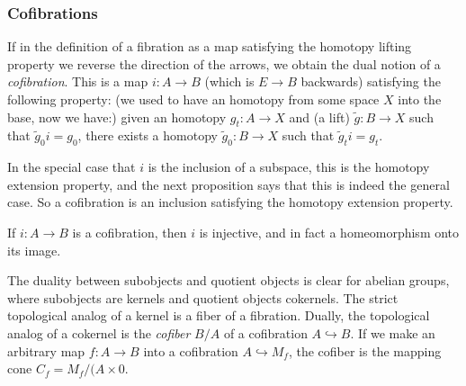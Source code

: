 \subsubsection{Cofibrations}

\begin{definition}[Hatcher]
	If in the definition of a fibration as a map satisfying the homotopy lifting property we reverse the direction of the arrows, we obtain the dual notion of a {\it cofibration}. This is a map $i:A\to B$ {\color{persimmon}(which is $E\to B$ backwards)} satisfying the following property: {\color{persimmon}(we used to have an homotopy from some space $X$ into the base, now we have:)} given an homotopy $g_{t}:A\to X$ and {\color{persimmon}(a lift)}  $\tilde{g}:B\to X$ such that $\tilde{g}_{0}i=g_{0}$, there exists a homotopy $\tilde{g}_{0}:B\to X$ such that $\tilde{g}_{t}i=g_{t}$.

	In the special case that $i$ is the inclusion of a subspace, this is the homotopy extension property, and the next proposition says that this is indeed the general case. So a cofibration is an inclusion satisfying the homotopy extension property.
\end{definition}

\begin{proposition}[4H.1]
	If $i:A\to B$ is a cofibration, then $i$ is injective, and in fact a homeomorphism onto its image.
\end{proposition}

\begin{remark}
The duality between subobjects and quotient objects is clear for abelian groups,
where subobjects are kernels and quotient objects cokernels. The strict
topological analog of a kernel is a fiber of a fibration. Dually, the
topological analog of a cokernel is the {\it cofiber} $B/A$ of a
cofibration $A\hookrightarrow B$. If we make an arbitrary map  $f:A\to B$ into a
cofibration $A\hookrightarrow M_{f}$, the cofiber is the mapping cone
$C_{f}=M_{f}/(A\times {0}$.
\end{remark}

